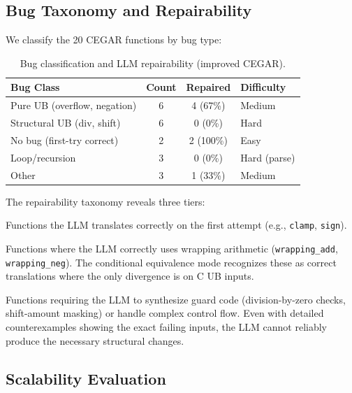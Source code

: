 \documentclass[11pt]{article}
\begin{document}
\subsection{Bug Taxonomy and Repairability}\label{sec:eval:taxonomy}

We classify the 20 CEGAR functions by bug type:

\begin{table}[t]
\centering
\caption{Bug classification and LLM repairability (improved CEGAR).}\label{tab:taxonomy}
\begin{tabular}{@{}lccl@{}}
\toprule
\textbf{Bug Class} & \textbf{Count} & \textbf{Repaired} & \textbf{Difficulty} \\
\midrule
Pure UB (overflow, negation) & 6 & 4 (67\%) & Medium \\
Structural UB (div, shift)   & 6 & 0 (0\%)  & Hard \\
No bug (first-try correct)   & 2 & 2 (100\%) & Easy \\
Loop/recursion               & 3 & 0 (0\%)  & Hard (parse) \\
Other                        & 3 & 1 (33\%) & Medium \\
\bottomrule
\end{tabular}
\end{table}

The repairability taxonomy reveals three tiers:
\begin{description}[leftmargin=*,nosep]
\item[Easy (trivially correct):] Functions the LLM translates correctly on
     the first attempt (e.g., \texttt{clamp}, \texttt{sign}).

\item[Medium (UB wrapping):] Functions where the LLM correctly uses wrapping
     arithmetic (\texttt{wrapping\_add}, \texttt{wrapping\_neg}).  The
     conditional equivalence mode recognizes these as correct translations
     where the only divergence is on C UB inputs.

\item[Hard (structural repair):] Functions requiring the LLM to synthesize
     guard code (division-by-zero checks, shift-amount masking) or handle
     complex control flow.  Even with detailed counterexamples showing
     the exact failing inputs, the LLM cannot reliably produce the
     necessary structural changes.
\end{description}

\subsection{Scalability Evaluation}\label{sec:eval:scalability}
\end{document}
